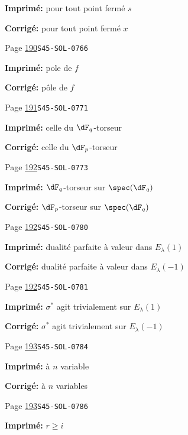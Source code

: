\begin{description}
\par\noindent\textbf{Imprimé:} pour tout point fermé $s$
\par\noindent\textbf{Corrigé:} pour tout point fermé $x$
\smallskip
\item[\hypertarget{apparatus:FR-0162}{162}] Page \hyperlink{printpage:fr:190}{190}\quad\texttt{S45-SOL-0766}
\par\noindent\textbf{Imprimé:} pole de $f$
\par\noindent\textbf{Corrigé:} pôle de $f$
\smallskip
\item[\hypertarget{apparatus:FR-0163}{163}] Page \hyperlink{printpage:fr:191}{191}\quad\texttt{S45-SOL-0771}
\par\noindent\textbf{Imprimé:} celle du $\dF_q$-torseur
\par\noindent\textbf{Corrigé:} celle du $\dF_p$-torseur
\smallskip
\item[\hypertarget{apparatus:FR-0164}{164}] Page \hyperlink{printpage:fr:192}{192}\quad\texttt{S45-SOL-0773}
\par\noindent\textbf{Imprimé:} $\dF_q$-torseur sur $\spec(\dF_q)$
\par\noindent\textbf{Corrigé:} $\dF_p$-torseur sur $\spec(\dF_q)$
\smallskip
\item[\hypertarget{apparatus:FR-0165}{165}] Page \hyperlink{printpage:fr:192}{192}\quad\texttt{S45-SOL-0780}
\par\noindent\textbf{Imprimé:} dualité parfaite à valeur dans $E_\lambda(1)$
\par\noindent\textbf{Corrigé:} dualité parfaite à valeur dans $E_\lambda(-1)$
\smallskip
\item[\hypertarget{apparatus:FR-0166}{166}] Page \hyperlink{printpage:fr:192}{192}\quad\texttt{S45-SOL-0781}
\par\noindent\textbf{Imprimé:} $\sigma^\ast$ agit trivialement sur $E_\lambda(1)$
\par\noindent\textbf{Corrigé:} $\sigma^\ast$ agit trivialement sur $E_\lambda(-1)$
\smallskip
\item[\hypertarget{apparatus:FR-0167}{167}] Page \hyperlink{printpage:fr:193}{193}\quad\texttt{S45-SOL-0784}
\par\noindent\textbf{Imprimé:} à $n$ variable
\par\noindent\textbf{Corrigé:} à $n$ variables
\smallskip
\item[\hypertarget{apparatus:FR-0168}{168}] Page \hyperlink{printpage:fr:193}{193}\quad\texttt{S45-SOL-0786}
\par\noindent\textbf{Imprimé:} $r\geqslant i$

\end{description}
